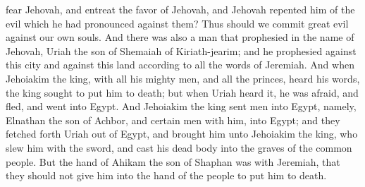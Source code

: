 fear Jehovah, and entreat the favor of Jehovah, and Jehovah repented him of the evil which he had pronounced against them? Thus should we commit great evil against our own souls.  And there was also a man that prophesied in the name of Jehovah, Uriah the son of Shemaiah of Kiriath-jearim; and he prophesied against this city and against this land according to all the words of Jeremiah. And when Jehoiakim the king, with all his mighty men, and all the princes, heard his words, the king sought to put him to death; but when Uriah heard it, he was afraid, and fled, and went into Egypt. And Jehoiakim the king sent men into Egypt, namely, Elnathan the son of Achbor, and certain men with him, into Egypt; and they fetched forth Uriah out of Egypt, and brought him unto Jehoiakim the king, who slew him with the sword, and cast his dead body into the graves of the common people. But the hand of Ahikam the son of Shaphan was with Jeremiah, that they should not give him into the hand of the people to put him to death. 

